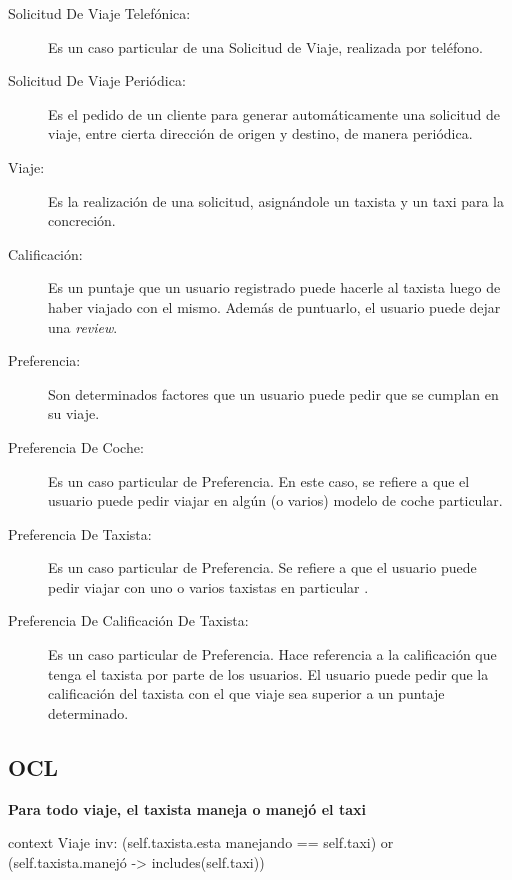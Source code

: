 \documentclass[a4paper, 10pt, twoside]{article}
\newenvironment{ocl}[1]
  {
    \textbf{#1}
    \verbatim
  }{
    \endverbatim
  }
\begin{document}
\begin{description}
  \item[Solicitud De Viaje Telefónica:] Es un caso particular de una Solicitud de Viaje, realizada por teléfono.

  \item[Solicitud De Viaje Periódica:] Es el pedido de un cliente para generar automáticamente una solicitud de viaje, entre cierta direcci\'on de origen y destino, de manera periódica. 
  
  \item[Viaje:] Es la realización de una solicitud, asignándole un taxista y un taxi para la concreción.
  
  \item[Calificación:] Es un puntaje que un usuario registrado puede hacerle al taxista luego de haber viajado con el mismo. Además de puntuarlo, el usuario puede dejar una \emph{review}.

  \item[Preferencia:] Son determinados factores que un usuario puede pedir que se cumplan en su viaje.

  \item[Preferencia De Coche:] Es un caso particular de Preferencia. En este caso, se refiere a que el usuario puede pedir viajar en algún (o varios) modelo de coche particular.

  \item[Preferencia De Taxista:] Es un caso particular de Preferencia. Se refiere a que el usuario puede pedir viajar con uno o varios taxistas en particular .

  \item[Preferencia De Calificación De Taxista:] Es un caso particular de Preferencia. Hace referencia a la calificación que tenga el taxista por parte de los usuarios. El usuario puede pedir que la calificación del taxista con el que viaje sea superior a un puntaje determinado.

\end{description}


\subsection{OCL}

\begin{ocl}{Para todo viaje, el taxista maneja o manejó el taxi}
  context Viaje
  inv: (self.taxista.esta manejando == self.taxi) or
       (self.taxista.manejó -> includes(self.taxi)) 
\end{ocl}
\end{document}
